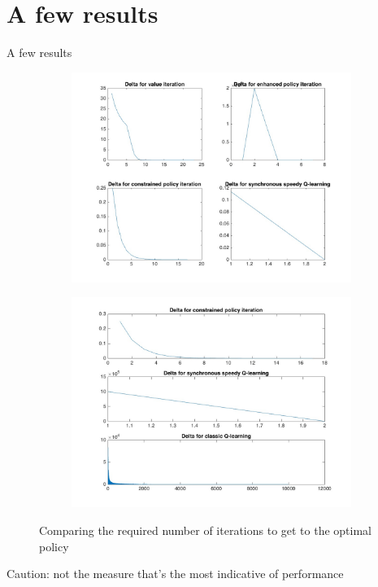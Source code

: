 \documentclass{beamer}
\begin{document}
\section{A few results}
\begin{frame}{A few results}
\begin{figure}
\begin{center}
\begin{subfigure}{.5\textwidth}
\includegraphics[width=1\linewidth]{deltas.jpg}
\end{subfigure}%
\begin{subfigure}{.5\textwidth}
\includegraphics[width=1\linewidth]{deltas_the_sequel.jpg}
\end{subfigure}
\caption{Comparing the required number of iterations to get to the optimal policy}
\end{center}
\end{figure}
Caution: not the measure that's the most indicative of performance
\end{frame}
\end{document}
